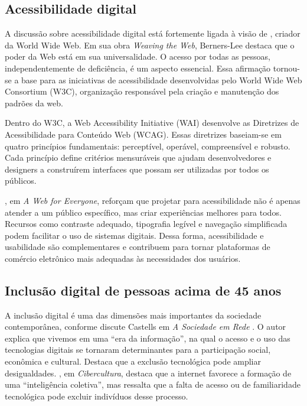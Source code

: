 \documentclass[12pt,a4paper]{article}
\begin{document}
\subsection{Acessibilidade digital}

A discussão sobre acessibilidade digital está fortemente ligada à visão de , criador da World Wide Web. Em sua obra \textit{Weaving the Web}, Berners-Lee destaca que o poder da Web está em sua universalidade. O acesso por todas as pessoas, independentemente de deficiência, é um aspecto essencial. Essa afirmação tornou-se a base para as iniciativas de acessibilidade desenvolvidas pelo World Wide Web Consortium (W3C), organização responsável pela criação e manutenção dos padrões da web.

Dentro do W3C, a Web Accessibility Initiative (WAI) desenvolve as Diretrizes de Acessibilidade para Conteúdo Web (WCAG). Essas diretrizes baseiam-se em quatro princípios fundamentais: perceptível, operável, compreensível e robusto. Cada princípio define critérios mensuráveis que ajudam desenvolvedores e designers a construírem interfaces que possam ser utilizadas por todos os públicos.

, em \textit{A Web for Everyone}, reforçam que projetar para acessibilidade não é apenas atender a um público específico, mas criar experiências melhores para todos. Recursos como contraste adequado, tipografia legível e navegação simplificada podem facilitar o uso de sistemas digitais. Dessa forma, acessibilidade e usabilidade são complementares e contribuem para tornar plataformas de comércio eletrônico mais adequadas às necessidades dos usuários.

\subsection{Inclusão digital de pessoas acima de 45 anos}

A inclusão digital é uma das dimensões mais importantes da sociedade contemporânea, conforme discute Castells em \textit{A Sociedade em Rede} \cite{castells1999}. O autor explica que vivemos em uma ``era da informação'', na qual o acesso e o uso das tecnologias digitais se tornaram determinantes para a participação social, econômica e cultural. Destaca que a exclusão tecnológica pode ampliar desigualdades. , em \textit{Cibercultura}, destaca que a internet favorece a formação de uma ``inteligência coletiva'', mas ressalta que a falta de acesso ou de familiaridade tecnológica pode excluir indivíduos desse processo.
\end{document}
